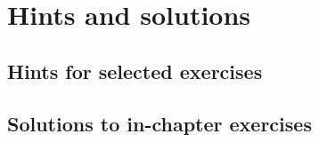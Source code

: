 \chapter{Hints and solutions}
\label{apxHintsSolutions}

\renewcommand\chaptername{Hints and solutions}

\newpage

\section{Hints for selected exercises}
\label{secHints}

\printhints

\newpage
\section{Solutions to in-chapter exercises}
\label{secSolutions}

\printsolutions